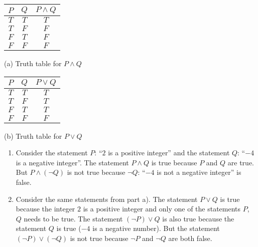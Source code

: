 \begin{center}
	\begin{minipage}{0.45\textwidth}
	\centering
	\begin{tabular}{c|c|c}
	$P$ & $Q$ & $P \wedge Q$ \\\hline 
	$T$ & $T$ & $T$ \\\hline 
	$T$ & $F$ & $F$ \\\hline 
	$F$ & $T$ & $F$ \\\hline 
	$F$ & $F$ & $F$ \\
	\end{tabular}\vspace*{4pt}

	(a) Truth table for $P \wedge Q$
	\end{minipage}
	\begin{minipage}{0.45\textwidth}
	\centering
	\begin{tabular}{c|c|c}
	$P$ & $Q$ & $P \vee Q$ \\\hline 
	$T$ & $T$ & $T$ \\\hline 
	$T$ & $F$ & $T$ \\\hline 
	$F$ & $T$ & $T$ \\\hline 
	$F$ & $F$ & $F$ \\
	\end{tabular}\vspace*{4pt}

	(b) Truth table for $P \vee Q$
	\end{minipage}
\end{center}

\vspace*{12pt}

\begin{example}
\begin{enumerate}[label=\alph*)]
\item Consider the statement $P$: ``$2$ is a positive integer'' and the statement $Q$: ``$-4$ is a negative integer''. The statement $P \wedge Q$ is true because $P$ and $Q$ are true. But $P \wedge (\neg Q)$ is not true because $\neg Q$: ``$-4$ is not a negative integer'' is false.
\item Consider the same statements from part a). The statement $P \vee Q$ is true because the integer $2$ is a positive integer and only one of the statements $P$, $Q$ needs to be true. The statement $(\neg P) \vee Q$ is also true because the statement $Q$ is true ($-4$ is a negative number). But the statement $(\neg P) \vee (\neg Q)$ is not true because $\neg P$ and $\neg Q$ are both false.
\end{enumerate}
\end{example}

